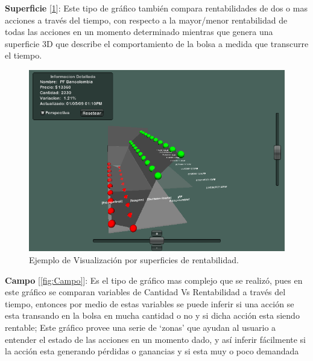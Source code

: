 \textbf{Superficie} [\ref{fig:Superficie}]: Este tipo de gráfico también compara rentabilidades de dos o mas acciones a través del tiempo, con respecto a la mayor/menor rentabilidad de todas las acciones en un momento determinado  mientras que genera una superficie 3D que describe el comportamiento de la bolsa a medida que transcurre el tiempo.\\

\begin{figure}[h]
	\centering
		\includegraphics[scale=0.3]{Superficie.png}
		\caption{Ejemplo de Visualización por superficies de rentabilidad.}
	\label{fig:Superficie}
\end{figure}

\textbf{Campo} [\ref{fig:Campo}]: Es el tipo de gráfico mas complejo que se realizó, pues en este gráfico se comparan variables de Cantidad Vs Rentabilidad a través del tiempo\cite{383531}, entonces por medio de estas variables se puede inferir si una acción se esta transando en la bolsa en mucha cantidad o no y si dicha acción esta siendo rentable; Este gráfico provee una serie de `zonas' que ayudan al usuario a entender el estado de las acciones en un momento dado, y así inferir fácilmente si la acción esta generando pérdidas o ganancias y si esta muy o poco demandada\\

